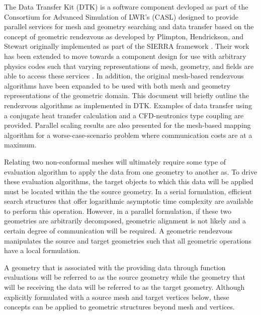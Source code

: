 \documentclass{mc2013}
\begin{document}
The Data Transfer Kit (DTK) is a software component devloped as part
of the Consortium for Advanced Simulation of LWR's (CASL)
\cite{u.s._department_of_energy_casl_2011} designed to provide
parallel services for mesh and geometry searching and data transfer
based on the concept of geometric rendezvous as developed by Plimpton,
Hendrickson, and Stewart \cite{Plimpton_2004} originally implemented
as part of the SIERRA framework \cite{Stewart_2004}. Their work has
been extended to move towards a component design for use with
arbitrary physics codes such that varying representations of mesh,
geometry, and fields are able to access these services
\cite{Chand_2008}. In addition, the original mesh-based rendezvous
algorithms have been expanded to be used with both mesh and geometry
representations of the geometric domain. This document will briefly
outline the rendezvous algorithms as implemented in DTK. Examples of
data transfer using a conjugate heat transfer calculation and a
CFD-neutronics type coupling are provided. Parallel scaling results
are also presented for the mesh-based mapping algorithm for a
worse-case-scenario problem where communication costs are at a
maximum.


\label{sec:geometric_rendezvous}

Relating two non-conformal meshes will ultimately require some type of
evaluation algorithm to apply the data from one geometry to another
as. To drive these evaluation algorithms, the target objects to which
this data will be applied must be located within the the source
geometry. In a serial formulation, efficient search structures that
offer logarithmic asymptotic time complexity are available to perform
this operation. However, in a parallel formulation, if these two
geometries are arbitrarily decomposed, geometric alignment is not
likely and a certain degree of communication will be required. A
geometric rendezvous manipulates the source and target geometries such
that all geometric operations have a local formulation.

A geometry that is associated with the providing data through function
evaluations will be referred to as the source geometry while the
geometry that will be receiving the data will be referred to as the
target geometry. Although explicitly formulated with a source mesh and
target vertices below, these concepts can be applied to geometric
structures beyond mesh and vertices.
\end{document}
